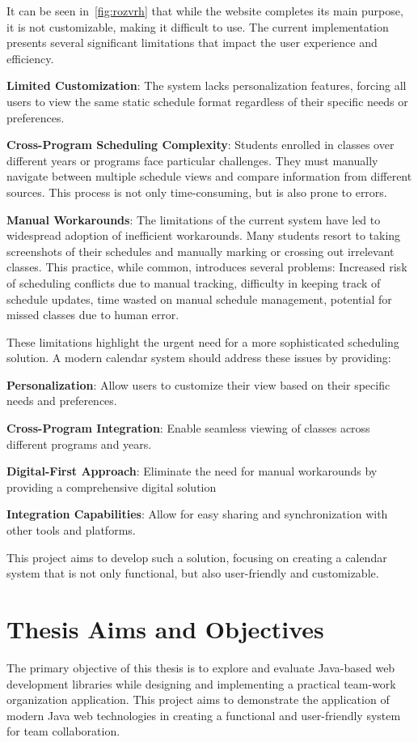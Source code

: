It can be seen in~\ref{fig:rozvrh} that while the website completes its main purpose, it is not customizable, making it difficult to use.
The current implementation presents several significant limitations that impact the user experience and efficiency.

\textbf{Limited Customization}: The system lacks personalization features, forcing all users to view the same static schedule format regardless of their specific needs or preferences.

\textbf{Cross-Program Scheduling Complexity}: Students enrolled in classes over different years or programs face particular challenges.
They must manually navigate between multiple schedule views and compare information from different sources.
This process is not only time-consuming, but is also prone to errors.

\textbf{Manual Workarounds}: The limitations of the current system have led to widespread adoption of inefficient workarounds.
Many students resort to taking screenshots of their schedules and manually marking or crossing out irrelevant classes.
This practice, while common, introduces several problems:
Increased risk of scheduling conflicts due to manual tracking,
difficulty in keeping track of schedule updates,
time wasted on manual schedule management,
potential for missed classes due to human error.


These limitations highlight the urgent need for a more sophisticated scheduling solution.
A modern calendar system should address these issues by providing:

\textbf{Personalization}: Allow users to customize their view based on their specific needs and preferences.

\textbf{Cross-Program Integration}: Enable seamless viewing of classes across different programs and years.

\textbf{Digital-First Approach}: Eliminate the need for manual workarounds by providing a comprehensive digital solution

\textbf{Integration Capabilities}: Allow for easy sharing and synchronization with other tools and platforms.


This project aims to develop such a solution, focusing on creating a calendar system that is not only functional, but also user-friendly and customizable.


\section{Thesis Aims and Objectives}\label{sec:thesis-aims}
The primary objective of this thesis is to explore and evaluate Java-based web development libraries while designing and implementing a practical team-work organization application.
This project aims to demonstrate the application of modern Java web technologies in creating a functional and user-friendly system for team collaboration.

